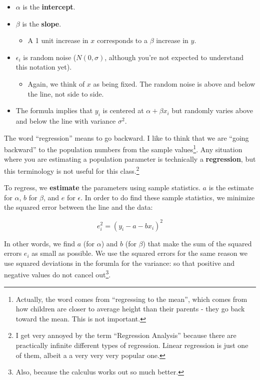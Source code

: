 \documentclass[
  letterpaper,
  DIV=11,
  numbers=noendperiod,
  oneside]{scrreprt}
\providecommand{\tightlist}{%
  \setlength{\itemsep}{0pt}\setlength{\parskip}{0pt}}\usepackage{longtable,booktabs,array}
\begin{document}
\begin{itemize}
\tightlist
\item
  \(\alpha\) is the \textbf{intercept}.
\item
  \(\beta\) is the \textbf{slope}.

  \begin{itemize}
  \tightlist
  \item
    A 1 unit increase in \(x\) corresponds to a \(\beta\) increase in
    \(y\).
  \end{itemize}
\item
  \(\epsilon_i\) is random noise (\(N(0,\sigma)\), although you're not
  expected to understand this notation yet).

  \begin{itemize}
  \tightlist
  \item
    Again, we think of \(x\) as being fixed. The random noise is above
    and below the line, not side to side.
  \end{itemize}
\item
  The formula implies that \(y_i\) is centered at \(\alpha + \beta x_i\)
  but randomly varies above and below the line with variance
  \(\sigma^2\).
\end{itemize}

The word ``regression'' means to go backward. I like to think that we
are ``going backward'' to the population numbers from the sample
values\footnote{Actually, the word comes from ``regressing to the
  mean'', which comes from how children are closer to average height
  than their parents - they go back toward the mean. This is not
  important.}. Any situation where you are estimating a population
parameter is technically a \textbf{regression}, but this terminology is
not useful for this class.\footnote{I get very annoyed by the term
  ``Regression Analysis'' because there are practically infinite
  different types of regression. Linear regression is just one of them,
  albeit a a very very very popular one.}

To regress, we \textbf{estimate} the parameters using sample statistics.
\(a\) is the estimate for \(\alpha\), \(b\) for \(\beta\), and \(e\) for
\(\epsilon\). In order to do find these sample statistics, we minimize
the squared error between the line and the data:

\[e_i^2 = (y_i - a - b x_i)^2\]

In other words, we find \(a\) (for \(\alpha\)) and \(b\) (for \(\beta\))
that make the sum of the squared errors \(e_i\) as small as possible. We
use the squared errors for the same reason we use squared deviations in
the forumla for the variance: so that positive and negative values do
not cancel out\footnote{Also, because the calculus works out so much
  better.}.
\end{document}
